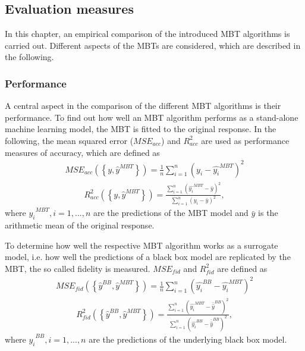 \subsection{Evaluation measures}
In this chapter, an empirical comparison of the introduced MBT algorithms is carried out. Different aspects of the MBTs are considered, which are described in the following.

\subsubsection{Performance}
A central aspect in the comparison of the different MBT algorithms is their performance. 
To find out how well an MBT algorithm performs as a stand-alone machine learning model, the MBT is fitted to the original response. 
In the following, the mean squared error ($MSE_{acc}$) and $R^2_{acc}$ are used as performance measures of accuracy, which are defined as
\begin{align}
    MSE_{acc} \left( \left\{y, \hat{y}^{MBT}\right\}\right) = \frac{1}{n}\sum_{i = 1}^{n}\left(y_{i}-\hat{y_{i}}^{MBT}\right)^2
\end{align}
\begin{align}
    R^2_{acc}\left( \left\{y, \hat{y}^{MBT}\right\}\right) = \frac{\sum_{i = 1}^{n}\left(\hat{y_{i}}^{MBT} - \bar{y}\right)^2}{\sum_{i = 1}^{n}\left(y_{i} - \bar{y}\right)^2},
\end{align}
where $\hat{y_i}^{MBT}, i = 1,...,n$ are the predictions of the MBT model and $\bar{y}$ is the arithmetic mean of the original response.




To determine how well the respective MBT algorithm works as a surrogate model, i.e. how well the predictions of a black box model are replicated by the MBT, the so called fidelity is measured. 
$MSE_{fid}$ and $R^2_{fid}$ are defined as
\begin{align}
    MSE_{fid} \left( \left\{\hat{y}^{BB}, \hat{y}^{MBT}\right\}\right) = \frac{1}{n}\sum_{i = 1}^{n}\left(\hat{y_{i}}^{BB}-\hat{y_{i}}^{MBT}\right)^2
\end{align}
\begin{align}
    R^2_{fid}\left( \left\{\hat{y}^{BB}, \hat{y}^{MBT}\right\}\right) = \frac{\sum_{i = 1}^{n}\left(\hat{y_{i}}^{MBT} - \bar{\hat{y}}^{BB}\right)^2}{\sum_{i = 1}^{n}\left(\hat{y_{i}}^{BB} - \bar{\hat{y}}^{BB}\right)^2},
\end{align} 
where $\hat{y_i}^{BB}, i = 1,...,n$ are the predictions of the underlying black box model.

